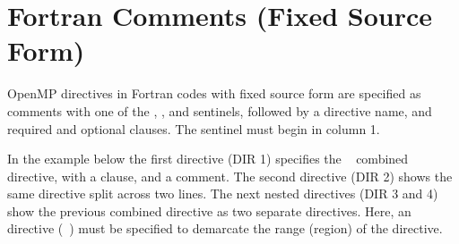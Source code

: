 \section{Fortran Comments (Fixed Source Form)}
\label{sec:fortran_fixed_format_comments}

OpenMP directives in Fortran codes with fixed source form are specified as comments with one of the
, , and  sentinels, followed by a
directive name, and required and optional clauses.  The sentinel must begin in column 1.

In the example below the first directive (DIR 1) specifies the %
~ combined directive, with a  clause, and a comment.
The second directive (DIR 2) shows the same directive split
across two lines. The next nested directives (DIR 3 and 4) show the previous combined directive as
two separate directives. 
Here, an  directive (~) must be specified to demarcate the range (region)
of the  directive.

\clearpage
